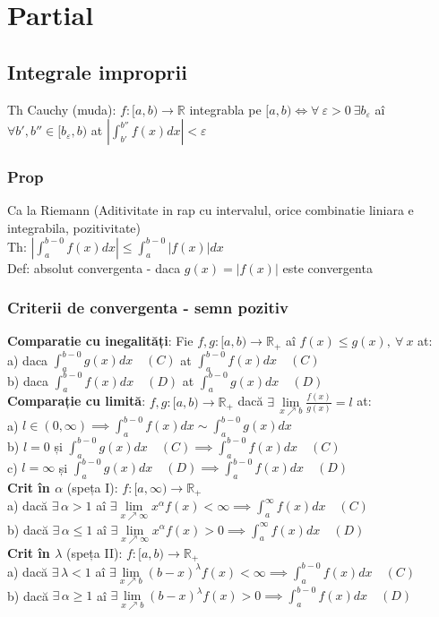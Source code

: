 \documentclass{article}
\newcommand*{\R}{\mathbb{R}}
\renewcommand*{\epsilon}{\varepsilon}
\newcommand*{\fint}[1]{\int_{a}^{b-0} #1(x) dx}
\newcommand*{\finty}[1]{\int_{a}^{\infty} #1(x) dx}
\begin{document}
\section{Partial}
\subsection*{Integrale improprii}
Th Cauchy (muda): $f : [a, b) \to \R$ integrabla pe $[a, b) \iff \forall\ \varepsilon > 0\ \exists b_{\epsilon} $ aî $\forall b', b'' \in [b_{\varepsilon}, b)$ at
$\left| \int_{b'}^{b''} f(x)dx \right| <\epsilon $
\subsubsection*{Prop}
Ca la Riemann (Aditivitate in rap cu intervalul, orice combinatie liniara e integrabila, pozitivitate)\\
Th: $\left | \int_a^{b-0} f(x)dx \right | \leq \int_a^{b-0} |f(x)|dx$\\
Def: absolut convergenta - daca $g(x) = |f(x)|$ este convergenta
\subsubsection*{Criterii de convergenta - semn pozitiv}

\textbf{Comparatie cu inegalități}: Fie $f, g: [a, b) \to \R_{+}$ aî $f(x) \leq g(x),\ \forall\ x$ at:\\
\quad a) daca $\int_a^{b-0} g(x)dx\quad (C)$ at $\int_a^{b-0} f(x)dx\quad (C)$\\
\quad b) daca $\int_a^{b-0} f(x)dx\quad (D)$ at $\int_a^{b-0} g(x)dx\quad (D)$
\\
\textbf{Comparație cu limită}: $f, g: [a, b) \to \R_{+}$ dacă
$\exists\,\lim\limits_{x\nearrow b} \frac{f(x)}{g(x)} = l$ at:\\
\quad a) $l \in (0, \infty) \implies \fint{f} \sim \fint{g}$\\
\quad b) $l = 0$ și $\fint{g}\quad (C) \implies \fint{f}\quad (C)$\\
\quad c) $l = \infty$ și $\fint{g}\quad (D) \implies \fint{f}\quad (D)$
\\
\textbf{Crit în $\alpha$} (speța I): \quad $f: [a, \infty) \to \R_+$\\
\quad a) dacă $\exists\, \alpha > 1 $ aî $\exists \lim\limits_{x\nearrow \infty} x^\alpha f(x) < \infty \implies \finty{f}\quad (C)$\\
\quad b) dacă $\exists\, \alpha \leq 1 $ aî $\exists \lim\limits_{x\nearrow \infty} x^\alpha f(x) > 0 \implies \finty{f}\quad (D)$
\\
\textbf{Crit în $\lambda$} (speța II): \quad $f: [a, b) \to \R_+$\\
\quad a) dacă $\exists\, \lambda < 1 $ aî $\exists \lim\limits_{x\nearrow b}
(b-x)^\lambda f(x) < \infty \implies \fint{f}\quad (C)$\\
\quad b) dacă $\exists\, \alpha \geq 1 $ aî $\exists \lim\limits_{x\nearrow b}
(b-x)^\lambda f(x) > 0 \implies \fint{f}\quad (D)$
\end{document}
